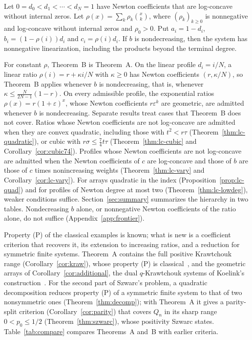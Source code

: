 \begin{mainthmB}
Let $0=d_0<d_1<\cdots<d_N=1$ have Newton coefficients that are log-concave without internal zeros. Let $\rho(x)=\sum_k\rho_k\binom xk$, where $(\rho_k)_{k\geq0}$ is nonnegative and log-concave without internal zeros and $\rho_0>0$. Put $a_i=1-d_i$, $b_i=(1-\rho(i))d_i$ and $c_i=\rho(i)d_i$. If $b$ is nondecreasing, then the system has nonnegative linearization, including the products beyond the terminal degree.
\end{mainthmB}

For constant $\rho$, Theorem~B is Theorem~A. On the linear profile $d_i=i/N$, a linear ratio $\rho(i)=r+\kappa i/N$ with $\kappa\geq0$ has Newton coefficients $(r,\kappa/N)$, so Theorem~B applies whenever $b$ is nondecreasing, that is, whenever $\kappa\leq\frac N{2N-1}(1-r)$. On every admissible profile, the exponential ratios $\rho(x)=r(1+\varepsilon)^x$, whose Newton coefficients $r\varepsilon^k$ are geometric, are admitted whenever $b$ is nondecreasing. Separate results treat cases that Theorem~B does not cover. Ratios whose Newton coefficients are not log-concave are admitted when they are convex quadratic, including those with $t^2<r\tau$ (Theorem~\ref{thm:lc-quadratic}), or cubic with $r\sigma\leq\frac74t\tau$ (Theorem~\ref{thm:lc-cubic} and Corollary~\ref{cor:cubic74}). Profiles whose Newton coefficients are not log-concave are admitted when the Newton coefficients of $c$ are log-concave and those of $b$ are those of $c$ times nonincreasing weights (Theorem~\ref{thm:lc-vary} and Corollary~\ref{cor:lc-vary}). For arrays quadratic in the index (Proposition~\ref{prop:lc-quad}) and for profiles of Newton degree at most two (Theorem~\ref{thm:lc-lowdeg}), weaker conditions suffice. Section~\ref{sec:summary} summarizes the hierarchy in two tables. Nondecreasing $b$ alone, or nonnegative Newton coefficients of the ratio alone, do not suffice (Appendix~\ref{app:frontier}).

Property (P) of the classical examples is known; what is new is a coefficient criterion that recovers it, its extension to increasing ratios, and a reduction for symmetric finite systems. Theorem~A contains the full positive Krawtchouk range (Corollary~\ref{cor:kraw}), whose property (P) is classical~\cite{eagleson,dunkl,szwarc}, and the geometric arrays of Corollary~\ref{cor:additional}, the dual $q$-Krawtchouk systems of Koelink's construction~\cite{koelink}. For the second part of Szwarc's problem, a quadratic decomposition reduces property (P) of a symmetric finite system to that of two nonsymmetric ones (Theorem~\ref{thm:decomp}); with Theorem~A it gives a parity-split criterion (Corollary~\ref{cor:parity}) that covers $Q_n$ in its sharp range $0<p_0\leq1/2$ (Theorem~\ref{thm:szwarc}), whose positivity Szwarc states. Table~\ref{tab:compare} compares Theorems~A and~B with earlier criteria.

